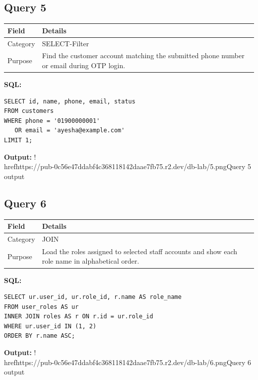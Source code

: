 \documentclass[11pt,a4paper]{article}
\begin{document}
\subsection{Query 5}
\begin{tabularx}{\linewidth}{>{\raggedright\arraybackslash}X|>{\raggedright\arraybackslash}X}
\hline
\textbf{Field} & \textbf{Details} \\ 
\hline
Category & SELECT-Filter \\ 
\hline
Purpose & Find the customer account matching the submitted phone number or email during OTP login. \\ 
\hline
\end{tabularx}
\textbf{SQL:}
\begin{lstlisting}
SELECT id, name, phone, email, status
FROM customers
WHERE phone = '01900000001'
   OR email = 'ayesha@example.com'
LIMIT 1;
\end{lstlisting}
\textbf{Output:}
!\\href{https://pub-0c56e47ddabf4c368118142daae7fb75.r2.dev/db-lab/5.png}{Query 5 output}
\subsection{Query 6}
\begin{tabularx}{\linewidth}{>{\raggedright\arraybackslash}X|>{\raggedright\arraybackslash}X}
\hline
\textbf{Field} & \textbf{Details} \\ 
\hline
Category & JOIN \\ 
\hline
Purpose & Load the roles assigned to selected staff accounts and show each role name in alphabetical order. \\ 
\hline
\end{tabularx}
\textbf{SQL:}
\begin{lstlisting}
SELECT ur.user_id, ur.role_id, r.name AS role_name
FROM user_roles AS ur
INNER JOIN roles AS r ON r.id = ur.role_id
WHERE ur.user_id IN (1, 2)
ORDER BY r.name ASC;
\end{lstlisting}
\textbf{Output:}
!\\href{https://pub-0c56e47ddabf4c368118142daae7fb75.r2.dev/db-lab/6.png}{Query 6 output}
\end{document}
